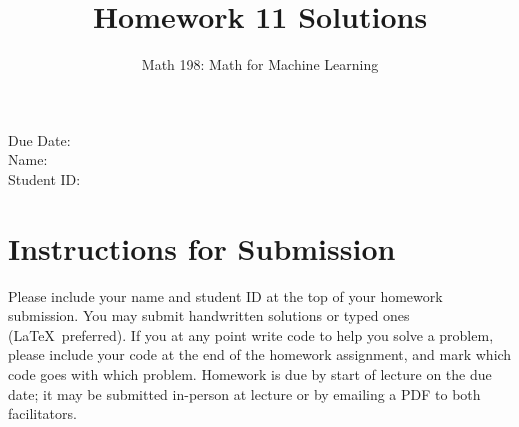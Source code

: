 \documentclass{article}
\title{Homework 11 Solutions}
\author{Math 198: Math for Machine Learning}
\date{}
\begin{document}
\maketitle

\noindent
Due Date:  \\
Name: \\
Student ID:

\section*{Instructions for Submission}
Please include your name and student ID at the top of your homework submission. You may submit handwritten solutions or typed ones (\LaTeX\ preferred). If you at any point write code to help you solve a problem, please include your code at the end of the homework assignment, and mark which code goes with which problem. Homework is due by start of lecture on the due date; it may be submitted in-person at lecture or by emailing a PDF to both facilitators.
\end{document}
